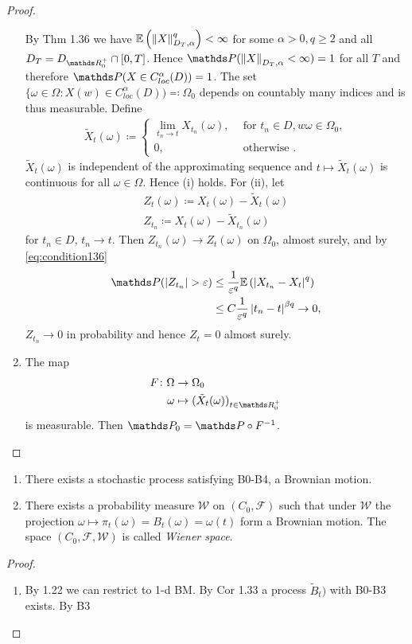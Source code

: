 \begin{proof}
\begin{enumerate}[label=\alph*)]
By Thm 1.36 we have $\mathbb{E}\left(\left\lVert X\right\rVert_{D_T,\alpha}^q\right)<\infty$ for some $\alpha>0,q\geq 2$ and all $D_T=D_{\R_0^+}\cap [0,T]$.
Hence $\Prob(\norm{X}_{D_T,\alpha}<\infty)=1$ for all $T$ and therefore $\Prob(X\in C_{loc}^\alpha (D))=1$.
The set $\{\omega \in \Omega \colon X(w) \in C_{loc}^\alpha(D))\eqqcolon \Omega_0$ depends on countably many indices and is thus measurable.
Define
\begin{align*}
\tilde{X}_t(\omega)\coloneqq \begin{cases}
\lim_{t_n \to t} X_{t_n}(\omega),~~&\text{for } t_n \in D, w \omega \in \Omega_0,\\
0, &\text{otherwise }.
\end{cases}
\end{align*}
$\tilde{X}_t(\omega)$ is independent of the approximating sequence and $t \mapsto \tilde{X}_t(\omega)$ is continuous for all $\omega \in \Omega$.
Hence (i) holds. For (ii), let
\begin{align*}
Z_t(\omega)\coloneqq X_t(\omega) -\tilde{X}_t(\omega)\\
Z_{t_n} \coloneqq X_t(\omega)-\tilde{X}_{t_n}(\omega)
\end{align*}
for $t_n \in D$, $t_n \to t$.
Then $Z_{t_n}(\omega)\to Z_t(\omega)$ on $\Omega_0$, \ie almost surely, and by \eqref{eq:condition136}
\begin{align*}
\Prob(\abs{Z_{t_n}}>\varepsilon)&\leq \frac{1}{\varepsilon^q}\E{\abs{X_{t_n}-X_t}^q}\\
&\leq C \frac{1}{\varepsilon^q}\abs{t_n-t}^{\beta q} \to 0,
\end{align*}
$Z_{t_n}\to 0$ in probability and hence $Z_t=0$ almost surely.
\item The map 
\begin{align*}
F \colon \Omega &\to \Omega_0\\
\omega &\mapsto (\tilde{X}_t(\omega))_{t\in \R_0^+}
\end{align*}
is measurable.
Then $\Prob_0=\Prob \circ F^{-1}$. \qedhere
\end{enumerate}
\end{proof}

\begin{thm}
\begin{enumerate}[label=\alph*)]
\item There exists a stochastic process satisfying B0-B4, \ie a Brownian motion.
\item There exists a probability measure $\mathcal{W}$ on $(C_0,\mathcal{F})$ such that under $\mathcal{W}$ the projection $\omega \mapsto \pi_t(\omega)=B_t(\omega)=\omega(t)$ form a Brownian motion.
The space $(C_0,\mathcal{F},\mathcal{W})$ is called \emph{Wiener space}.
\end{enumerate}
\end{thm}

\begin{proof}
\begin{enumerate}[label=(\roman*)]
\item By 1.22 we can restrict to 1-d BM.
By Cor 1.33 a process $\tilde{B}_t)$ with B0-B3 exists. By B3
\end{enumerate}
\end{proof}